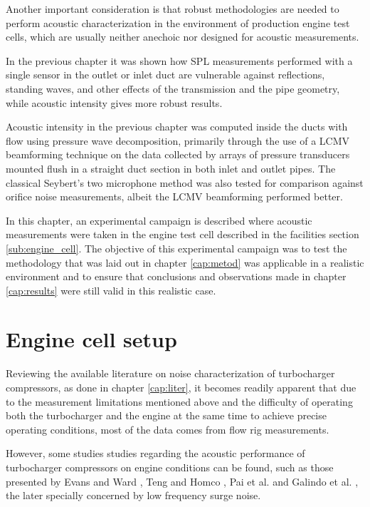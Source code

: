 Another important consideration is that robust methodologies are needed to perform acoustic characterization in the environment of production engine test cells, which are usually neither anechoic nor designed for acoustic measurements.

In the previous chapter it was shown how SPL measurements performed with a single sensor in the outlet or inlet duct are vulnerable against reflections, standing waves, and other effects of the transmission and the pipe geometry, while acoustic intensity gives more robust results.

Acoustic intensity in the previous chapter was computed inside the ducts with flow using pressure wave decomposition, primarily through the use of a LCMV beamforming technique on the data collected by arrays of pressure transducers mounted flush in a straight duct section in both inlet and outlet pipes. The classical Seybert's two microphone method \cite{seybert1988two} was also tested for comparison against orifice noise measurements, albeit the LCMV beamforming performed better.

In this chapter, an experimental campaign is described where acoustic measurements were taken in the engine test cell described in the facilities section \ref{sub:engine_cell}. The objective of this experimental campaign was to test the methodology that was laid out in chapter \ref{cap:metod} was applicable in a realistic environment and to ensure that conclusions and observations made in chapter \ref{cap:results} were still valid in this realistic case.

\section{Engine cell setup}
\label{sec:experimental_characterization}

Reviewing the available literature on noise characterization of turbocharger compressors, as done in chapter \ref{cap:liter}, it becomes readily apparent that due to the measurement limitations mentioned above and the difficulty of operating both the turbocharger and the engine at the same time to achieve precise operating conditions, most of the data comes from flow rig measurements.

However, some studies studies regarding the acoustic performance of turbocharger compressors on engine conditions can be found, such as those presented by Evans and Ward \cite{evans2005minimizing,evans2006reduction}, Teng and Homco \cite{teng2009investigation},  Pai et al. \cite{pai2013air,pai2015turbocharger} and Galindo et al. \cite{galindo2013engine,galindo2011measurement,galindo2008experiments}, the later specially concerned by low frequency surge noise.

